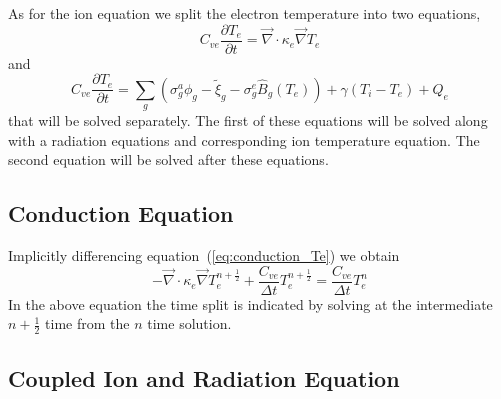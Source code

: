 \documentclass[12pt]{article}
\newcommand{\partl}[2]{\ensuremath{\frac{\partial{#1}}{\partial{#2}}}}\newcommand{\del}{\ensuremath{\vec{\nabla}}}
\newcommand{\Bg}{\ensuremath{\hat{B}_{g}}}
\begin{document}
As for the ion equation we split the electron temperature into two
equations,
\begin{equation}
        C_{ve} \partl{T_{e}}{t} = 
                \del \cdot \kappa_{e} \del T_{e}
\label{eq:conduction_Te}
\end{equation}
and
\begin{equation}
        C_{ve} \partl{T_{e}}{t} = 
                \sum_{g} \left(
                        \sigma_{g}^{a} \phi_{g} - \tilde{\xi}_{g}
                        - \sigma_{g}^{e} \Bg(T_{e}) \right)
                        + \gamma (T_{i} - T_{e}) + Q_{e}
\label{eq:couple_Te}
\end{equation}
that will be solved separately.
The first of these equations will be solved along with a radiation
equations and corresponding
ion temperature equation.
The second equation will be solved after these equations.

\subsection{Conduction Equation}

Implicitly differencing equation~(\ref{eq:conduction_Te})
we obtain
\begin{equation}
  \boxed{
     - \del \cdot \kappa_{e} \del T_{e}^{n+\frac{1}{2}}
     + \frac{C_{ve}}{\Delta t} T_{e}^{n+\frac{1}{2}}
           = \frac{C_{ve}}{\Delta t} T_{e}^{n}
   }
\label{eq:conduction_Te_tdiff}  
\end{equation}
In the above equation the time split is indicated by solving at the
intermediate $n+\frac{1}{2}$ time from the $n$ time solution.

\subsection{Coupled Ion and Radiation Equation}
\end{document}
